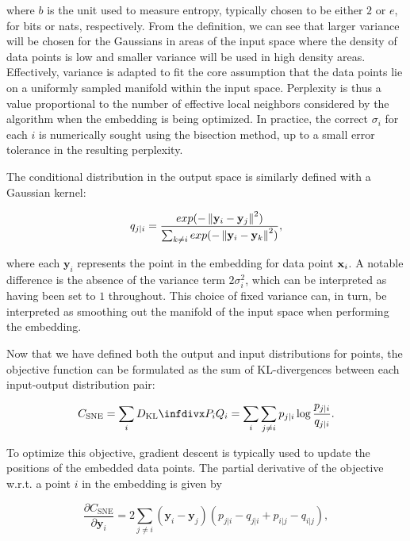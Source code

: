 where $b$ is the unit used to measure entropy, typically chosen to be either $2$ or $e$, for bits or nats, respectively. From the definition, we can see that larger variance will be chosen for the Gaussians in areas of the input space where the density of data points is low and smaller variance will be used in high density areas. Effectively, variance is adapted to fit the core assumption that the data points lie on a uniformly sampled manifold within the input space. Perplexity is thus a value proportional to the number of effective local neighbors considered by the algorithm when the embedding is being optimized. In practice, the correct $\sigma_i$ for each $i$ is numerically sought using the bisection method, up to a small error tolerance in the resulting perplexity.

The conditional distribution in the output space is similarly defined with a Gaussian kernel:

$$q_{j \vert i} = \frac{exp(-\left\lVert\mathbf{y}_i - \mathbf{y}_j\right\rVert^2)}{\sum_{k \neq i} exp(-\left\lVert\mathbf{y}_i - \mathbf{y}_k\right\rVert^2)},$$

where each $\mathbf{y}_i$ represents the point in the embedding for data point $\mathbf{x}_i$. A notable difference is the absence of the variance term $2 \sigma_i^2$, which can be interpreted as having been set to $1$ throughout. This choice of fixed variance can, in turn, be interpreted as smoothing out the manifold of the input space when performing the embedding.

Now that we have defined both the output and input distributions for points, the objective function can be formulated as the sum of KL-divergences between each input-output distribution pair:

\begin{equation}
C_{\text{SNE}} = \sum_i \dkl{P_i}{Q_i} = \sum_i \sum_{j \neq i} p_{j \vert i} \log \frac{p_{j \vert i}}{q_{j \vert i}}.
\label{eq:c_sne}
\end{equation}

To optimize this objective, gradient descent is typically used to update the positions of the embedded data points. The partial derivative of the objective w.r.t. a point $i$ in the embedding is given by

\begin{equation}
\frac{\partial C_{\text{SNE}}}{\partial \mathbf{y}_i} = 2 \sum_{j \neq i} (\mathbf{y}_i - \mathbf{y}_j)(p_{j \vert i} - q_{j \vert i} + p_{i \vert j} - q_{i \vert j}),
\label{eq:c_sne_grad}
\end{equation}

